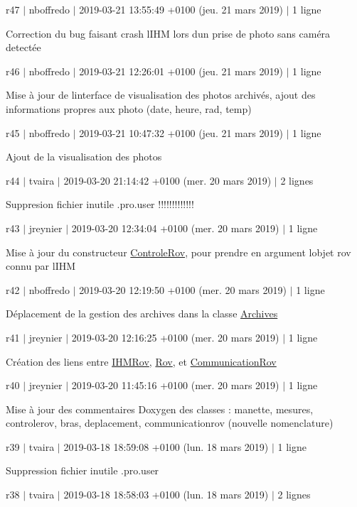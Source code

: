 r47 $\vert$ nboffredo $\vert$ 2019-\/03-\/21 13\+:55\+:49 +0100 (jeu. 21 mars 2019) $\vert$ 1 ligne

Correction du bug faisant crash l\textquotesingle{}I\+HM lors d\textquotesingle{}un prise de photo sans caméra detectée

r46 $\vert$ nboffredo $\vert$ 2019-\/03-\/21 12\+:26\+:01 +0100 (jeu. 21 mars 2019) $\vert$ 1 ligne

Mise à jour de l\textquotesingle{}interface de visualisation des photos archivés, ajout des informations propres aux photo (date, heure, rad, temp)

r45 $\vert$ nboffredo $\vert$ 2019-\/03-\/21 10\+:47\+:32 +0100 (jeu. 21 mars 2019) $\vert$ 1 ligne

Ajout de la visualisation des photos

r44 $\vert$ tvaira $\vert$ 2019-\/03-\/20 21\+:14\+:42 +0100 (mer. 20 mars 2019) $\vert$ 2 lignes

Suppresion fichier inutile .pro.\+user !!!!!!!!!!!!!

r43 $\vert$ jreynier $\vert$ 2019-\/03-\/20 12\+:34\+:04 +0100 (mer. 20 mars 2019) $\vert$ 1 ligne

Mise à jour du constructeur \hyperlink{class_controle_rov}{Controle\+Rov}, pour prendre en argument l\textquotesingle{}objet rov connu par l\textquotesingle{}I\+HM

r42 $\vert$ nboffredo $\vert$ 2019-\/03-\/20 12\+:19\+:50 +0100 (mer. 20 mars 2019) $\vert$ 1 ligne

Déplacement de la gestion des archives dans la classe \hyperlink{class_archives}{Archives}

r41 $\vert$ jreynier $\vert$ 2019-\/03-\/20 12\+:16\+:25 +0100 (mer. 20 mars 2019) $\vert$ 1 ligne

Création des liens entre \hyperlink{class_i_h_m_rov}{I\+H\+M\+Rov}, \hyperlink{class_rov}{Rov}, et \hyperlink{class_communication_rov}{Communication\+Rov}

r40 $\vert$ jreynier $\vert$ 2019-\/03-\/20 11\+:45\+:16 +0100 (mer. 20 mars 2019) $\vert$ 1 ligne

Mise à jour des commentaires Doxygen des classes \+: manette, mesures, controlerov, bras, deplacement, communicationrov (nouvelle nomenclature)

r39 $\vert$ tvaira $\vert$ 2019-\/03-\/18 18\+:59\+:08 +0100 (lun. 18 mars 2019) $\vert$ 1 ligne

Suppression fichier inutile .pro.\+user

r38 $\vert$ tvaira $\vert$ 2019-\/03-\/18 18\+:58\+:03 +0100 (lun. 18 mars 2019) $\vert$ 2 lignes

